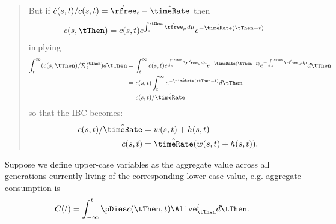 \documentclass{handout}
\begin{document}
\begin{enumerate}
{\begin{quote}
But if $\dot{c}(s,t)/c(s,t) = \hat{\rfree}_{t}-\hat{\timeRate}$ then
\begin{equation}\begin{gathered}\begin{aligned}
        c(s,\tThen) & =  c(s,t)e^{\int_{s}^{\tThen}\hat{\rfree}_\mu d\mu}e^{-\hat{\timeRate}(\tThen-t)}
\end{aligned}\end{gathered}\end{equation}
implying
\begin{equation}\begin{gathered}\begin{aligned}
        \int_{t}^{\infty} (c(s,\tThen)/\hat{\mathcal{R}}_{t}^{\tThen}) d\tThen & =  
\int_{t}^{\infty} c(s,t) e^{\int_{s}^{\tThen}\hat{\rfree}_\mu  d\mu}e^{-\hat{\timeRate}(\tThen-t)}e^{-\int_{s}^{\tThen}\hat{\rfree}_\mu d\mu} d\tThen \nonumber
\\         & =  c(s,t) \int_{t}^{\infty} e^{-\hat{\timeRate}(\tThen-t)} d\tThen
\\   & =  c(s,t)/\hat{\timeRate}
\end{aligned}\end{gathered}\end{equation}
so that the IBC becomes:
\begin{equation}\begin{gathered}\begin{aligned}
        c(s,t)/\hat{\timeRate} & =  w(s,t)+h(s,t)  \\
        c(s,t) & =  \hat{\timeRate} (w(s,t)+h(s,t)) .
\end{aligned}\end{gathered}\end{equation}

\end{quote}
}{\pagebreak

}

Suppose we define upper-case variables as the aggregate value across all
generations currently living of the corresponding lower-case value, e.g.
aggregate consumption is
\begin{equation}\begin{gathered}\begin{aligned}
        C(t) & =  \int_{-\infty}^{t} \pDies c(\tThen,t) \Alive_{\tThen}^{t} d\tThen.
\end{aligned}\end{gathered}\end{equation}


\end{enumerate}
\end{document}
